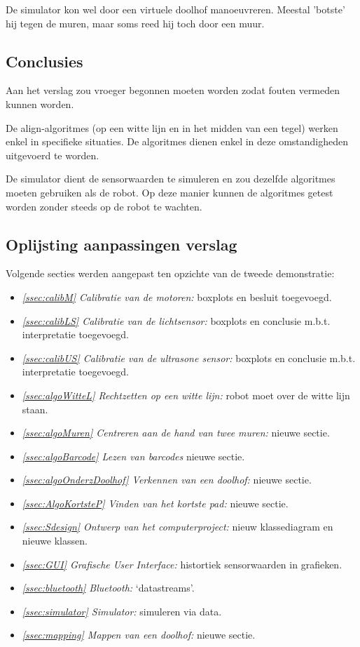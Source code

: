 \documentclass[t1]{penoverslag}
\begin{document}
De simulator kon wel door een virtuele doolhof manoeuvreren. Meestal 'botste' hij tegen de muren, maar soms reed hij toch door een muur.


\subsection{Conclusies} %
\label{Assec:conc2}
Aan het verslag zou vroeger begonnen moeten worden zodat fouten vermeden kunnen worden.

De align-algoritmes (op een witte lijn en in het midden van een tegel) werken enkel in specifieke situaties. De algoritmes dienen enkel in deze omstandigheden uitgevoerd te worden.

De simulator dient de sensorwaarden te simuleren en zou dezelfde algoritmes moeten gebruiken als de robot. Op deze manier kunnen de algoritmes getest worden zonder steeds op de robot te wachten.


\subsection{Oplijsting aanpassingen verslag} %
\label{Assec:aanp2}
Volgende secties werden aangepast ten opzichte van de tweede demonstratie:

\begin{itemize}
\item \textit{\ref{ssec:calibM} Calibratie van de motoren:} boxplots en besluit toegevoegd.
\item \textit{\ref{ssec:calibLS} Calibratie van de lichtsensor:} boxplots en conclusie m.b.t. interpretatie toegevoegd.
\item \textit{\ref{ssec:calibUS} Calibratie van de ultrasone sensor:} boxplots en conclusie m.b.t. interpretatie toegevoegd.
\item \textit{\ref{ssec:algoWitteL} Rechtzetten op een witte lijn:} robot moet over de witte lijn staan.
\item \textit{\ref{ssec:algoMuren} Centreren aan de hand van twee muren:} nieuwe sectie.
\item \textit{\ref{ssec:algoBarcode} Lezen van barcodes} nieuwe sectie.
\item \textit{\ref{ssec:algoOnderzDoolhof} Verkennen van een doolhof:} nieuwe sectie.
\item \textit{\ref{ssec:AlgoKortsteP} Vinden van het kortste pad:} nieuwe sectie.
\item \textit{\ref{ssec:Sdesign} Ontwerp van het computerproject:} nieuw klassediagram en nieuwe klassen.
\item \textit{\ref{ssec:GUI} Grafische User Interface:} histortiek sensorwaarden in grafieken.
\item \textit{\ref{ssec:bluetooth} Bluetooth:} `datastreams'.
\item \textit{\ref{ssec:simulator} Simulator:} simuleren via data.
\item \textit{\ref{ssec:mapping} Mappen van een doolhof:} nieuwe sectie.
\end{itemize}
\end{document}
